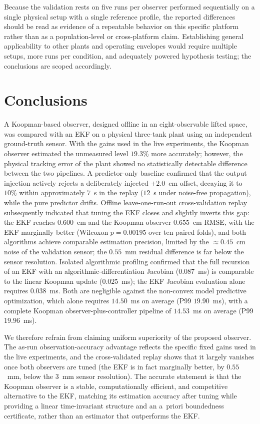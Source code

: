 \documentclass[asi,article,accept,pdftex,moreauthors]{Definitions/mdpi}
\newcommand{\rev}[1]{#1}%
\begin{document}
\rev{Because the validation rests on five runs per observer performed sequentially on a single physical setup with a single reference profile, the reported differences should be read as evidence of a repeatable behavior on this specific platform rather than as a population-level or cross-platform claim. Establishing general applicability to other plants and operating envelopes would require multiple setups, more runs per condition, and adequately powered hypothesis testing; the conclusions are scoped accordingly.}

\section{Conclusions}
\label{sec:conclusions}

A Koopman-based observer, designed offline in an eight-observable lifted space, was compared with an EKF on a physical three-tank plant using an independent ground-truth sensor. {With the gains used in the live experiments, the Koopman observer estimated the unmeasured level $19.3\%$ more accurately; however, the physical tracking error of the plant showed no statistically detectable difference between the two pipelines. {A predictor-only baseline confirmed that the output injection actively rejects a deliberately injected $+2.0$~cm offset, decaying it to $10\%$ within approximately $7$~s in the replay ($12$~s under noise-free propagation), while the pure predictor drifts.} Offline leave-one-run-out cross-validation replay subsequently indicated that tuning the EKF closes and slightly inverts this gap: the EKF reaches $0.600$~cm and the Koopman observer $0.655$~cm RMSE, with the EKF marginally better (Wilcoxon $p=0.00195$ over ten paired folds), and both algorithms achieve comparable estimation precision, limited by the $\approx 0.45$~cm noise of the validation sensor; the $0.55$~mm residual difference is far below the sensor resolution. Isolated algorithmic profiling confirmed that the full recursion of an EKF with an algorithmic-differentiation Jacobian ($0.087$~ms) is comparable to the linear Koopman update ($0.025$~ms); the EKF Jacobian evaluation alone requires $0.038$~ms. Both are negligible against the non-convex model predictive optimization, which alone requires $14.50$~ms on average (P99 $19.90$~ms), with a complete Koopman observer-plus-controller pipeline of $14.53$~ms on average (P99 $19.96$~ms).}

\rev{We therefore refrain from claiming uniform superiority of the proposed observer. The as-run observation-accuracy advantage reflects the specific fixed gains used in the live experiments, and the cross-validated replay shows that it largely vanishes once both observers are tuned (the EKF is in fact marginally better, by $0.55$~mm, below the $3$~mm sensor resolution). The accurate statement is that the Koopman observer is a stable, computationally efficient, and competitive alternative to the EKF, matching its estimation accuracy after tuning while providing a linear time-invariant structure and an a~priori boundedness certificate, rather than an estimator that outperforms the EKF.}
\end{document}
